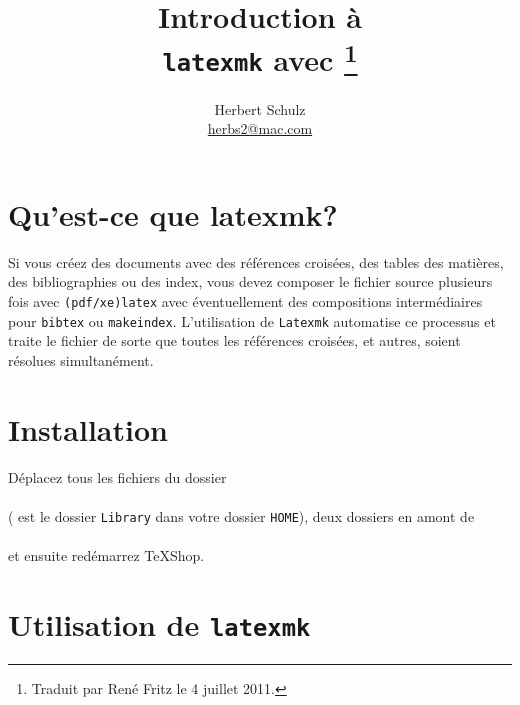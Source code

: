 \documentclass[11pt,french]{article}
\title{Introduction à\\ \texttt{latexmk} avec \TS\thanks{Traduit par René Fritz le 4 juillet 2011.}}
\author{Herbert Schulz\\\small\href{mailto:herbs2@mac.com}{herbs2@mac.com}}
\date{}
\newcommand{\TS}{\textsf{\TeX Shop}}
\begin{document}
\maketitle
\thispagestyle{empty}

\section*{Qu'est-ce que latexmk?}

Si vous créez des documents avec des références croisées, des tables des matières, des bibliographies ou des index, vous devez composer le fichier source plusieurs fois avec \texttt{(pdf/xe)latex} avec éventuellement des compositions intermédiaires pour \texttt{bibtex} ou \texttt{makeindex}. L'utilisation de \texttt{Latexmk} automatise ce processus et traite le fichier de sorte que toutes les références croisées, et autres, soient résolues simultanément.


\section*{Installation}

Déplacez tous les fichiers du dossier\\[5pt]
\\[5pt] 
( est le dossier \texttt{Library} dans votre dossier \texttt{HOME}), deux dossiers en amont de \\[5pt]
\\[5pt] 
et ensuite redémarrez \TS.

\section*{Utilisation de \texttt{latexmk}}
\end{document}
